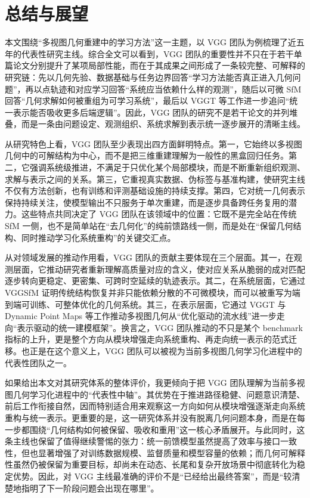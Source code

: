 \section{总结与展望}

本文围绕“多视图几何重建中的学习方法”这一主题，以 VGG 团队为例梳理了近五年的代表性研究主线。综合全文可以看到，VGG 团队的重要性并不只在于若干单篇论文分别提升了某项局部性能，而在于其成果之间形成了一条较完整、可解释的研究链：先以几何先验、数据基础与任务边界回答“学习方法能否真正进入几何问题”，再以点轨迹和对应学习回答“系统应当依赖什么样的观测”，随后以可微 SfM 回答“几何求解如何被重组为可学习系统”，最后以 VGGT 等工作进一步追问“统一表示能否吸收更多后端逻辑”\cite{wu2020unsup3d,wang2021deep2view,reizenstein2021co3d,bhalgat2023lighttouch,karaev2024cotracker,wang2024vggsfm,wang2025vggt}。因此，VGG 团队的研究不是若干论文的并列堆叠，而是一条由问题设定、观测组织、系统求解到表示统一逐步展开的清晰主线。

从研究特色上看，VGG 团队至少表现出四方面鲜明特点。第一，它始终以多视图几何中的可解结构为中心，而不是把三维重建理解为一般性的黑盒回归任务。第二，它强调系统级推进，不满足于只优化某个局部模块，而是不断重新组织观测、求解与表示之间的关系。第三，它重视真实数据、伪标签与基准构建，使研究主线不仅有方法创新，也有训练和评测基础设施的持续支撑\cite{reizenstein2021co3d,karaev2025cotracker3}。第四，它对统一几何表示保持持续关注，使模型输出不只服务于单次重建，而是逐步具备跨任务复用的潜力\cite{wang2025vggt,sucar2025dpm}。这些特点共同决定了 VGG 团队在该领域中的位置：它既不是完全站在传统 SfM 一侧，也不是简单站在“去几何化”的纯前馈路线一侧，而是处在“保留几何结构、同时推动学习化系统重构”的关键交汇点。

从对领域发展的推动作用看，VGG 团队的贡献主要体现在三个层面。其一，在观测层面，它推动研究者重新理解高质量对应的含义，使对应关系从脆弱的成对匹配逐步转向更稳定、更密集、可跨时空延续的轨迹表示\cite{bhalgat2023lighttouch,karaev2023dynamicstereo,karaev2024cotracker}。其二，在系统层面，它通过 VGGSfM 证明传统结构恢复并非只能依赖分散的不可微模块，而可以被重写为端到端可训练、可整体优化的几何系统\cite{wang2024vggsfm}。其三，在表示层面，它通过 VGGT 与 Dynamic Point Maps 等工作推动多视图几何从“优化驱动的流水线”进一步走向“表示驱动的统一建模框架”\cite{wang2025vggt,sucar2025dpm}。换言之，VGG 团队推动的不只是某个 benchmark 指标的上升，更是整个方向从模块增强走向系统重构、再走向统一表示的范式迁移。也正是在这个意义上，VGG 团队可以被视为当前多视图几何学习化进程中的代表性团队之一。

如果给出本文对其研究体系的整体评价，我更倾向于把 VGG 团队理解为当前多视图几何学习化进程中的“代表性中轴”。其优势在于推进路径稳健、问题意识清楚、前后工作衔接自然，因而特别适合用来观察这一方向如何从模块增强逐渐走向系统重构与统一表示。更重要的是，这一研究体系并没有脱离几何问题本身，而是在每一步都围绕“几何结构如何被保留、吸收和重用”这一核心矛盾展开。与此同时，这条主线也保留了值得继续警惕的张力：统一前馈模型虽然提高了效率与接口一致性，但也显著增强了对训练数据规模、监督质量和模型容量的依赖；而几何可解释性虽然仍被保留为重要目标，却尚未在动态、长尾和复杂开放场景中彻底转化为稳定优势\cite{wang2024vggsfm,wang2025vggt}。因此，对 VGG 主线最准确的评价不是“已经给出最终答案”，而是“较清楚地指明了下一阶段问题会出现在哪里”。

